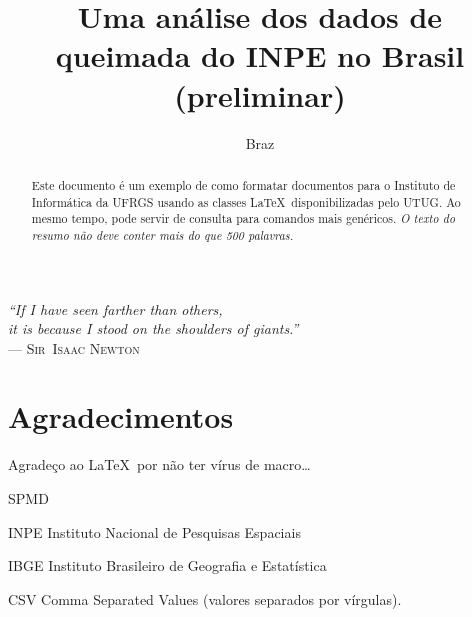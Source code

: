\documentclass[cic,tc]{iiufrgs}
\title{Uma análise dos dados de queimada do INPE no Brasil (preliminar)}
\author{Braz}{José Henrique da Silva}
\begin{document}
\maketitle

\clearpage
\begin{flushright}
\mbox{}\vfill
{\sffamily\itshape
``If I have seen farther than others,\\
it is because I stood on the shoulders of giants.''\\}
--- \textsc{Sir~Isaac Newton}
\end{flushright}

\chapter*{Agradecimentos}
Agradeço ao \LaTeX\ por não ter vírus de macro\ldots

\tableofcontents

\begin{listofabbrv}{SPMD}
        \item[INPE] Instituto Nacional de Pesquisas Espaciais
        \item[IBGE] Instituto Brasileiro de Geografia e Estatística
        \item[CSV] Comma Separated Values (valores separados por vírgulas).
\end{listofabbrv}


\listoffigures

\listoftables

\begin{abstract}
Este documento é um exemplo de como formatar documentos para o
Instituto de Informática da UFRGS usando as classes \LaTeX\
disponibilizadas pelo UTUG\@. Ao mesmo tempo, pode servir de consulta
para comandos mais genéricos. \emph{O texto do resumo não deve
conter mais do que 500 palavras.}
\end{abstract}
\end{document}
